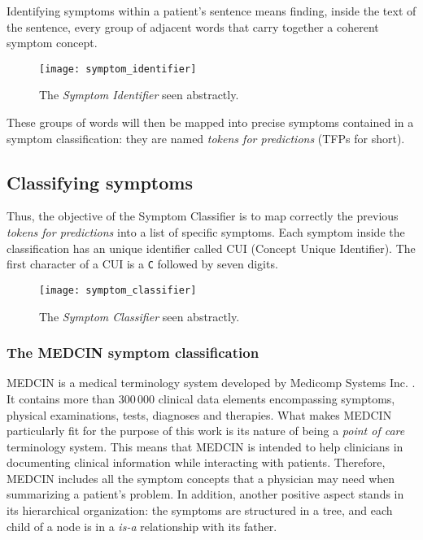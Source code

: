 Identifying symptoms within a patient's sentence means finding, inside the text of the sentence, every group of adjacent words that carry together a coherent symptom concept.

\begin{figure}[h]
\centering
\texttt{[image: symptom\_identifier]}
\caption{The \textit{Symptom Identifier} seen abstractly.}
\medskip
\end{figure}
These groups of words will then be mapped into precise symptoms contained in a symptom classification: they are named \textit{tokens for predictions} (TFPs for short).

\subsection{Classifying symptoms}
\label{sec:cla_symp}

Thus, the objective of the Symptom Classifier is to map correctly the previous \textit{tokens for predictions} into a list of specific symptoms. Each symptom inside the classification has an unique identifier called CUI (Concept Unique Identifier). The first character of a CUI is a \texttt{C} followed by seven digits.

\begin{figure}[h]
\centering
\texttt{[image: symptom\_classifier]}
\caption{The \textit{Symptom Classifier} seen abstractly.}
\medskip
\end{figure}

\subsubsection{The MEDCIN symptom classification}
MEDCIN is a medical terminology system developed by Medicomp Systems Inc. \cite{medcin}. It contains more than $300\,000$ clinical data elements encompassing symptoms, physical examinations, tests, diagnoses and therapies. What makes MEDCIN particularly fit for the purpose of this work is its nature of being a \textit{point of care} terminology system. This means that MEDCIN is intended to help clinicians in documenting clinical information while interacting with patients. Therefore, MEDCIN includes all the symptom concepts that a physician may need when summarizing a patient's problem. In addition, another positive aspect stands in its hierarchical organization: the symptoms are structured in a tree, and each child of a node is in a \textit{is-a} relationship with its father.

